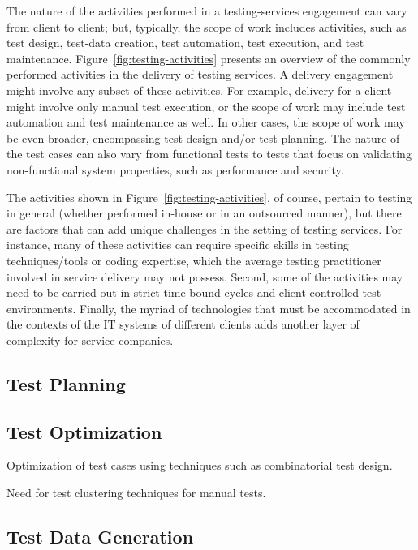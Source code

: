 The nature of the activities performed in a testing-services engagement can vary
from client to client; but, typically, the scope of work includes activities,
such as test design, test-data creation, test automation, test execution, and
test maintenance. Figure~\ref{fig:testing-activities} presents an overview of
the commonly performed activities in the delivery of testing services. A
delivery engagement might involve any subset of these activities. For example,
delivery for a client might involve only manual test execution, or the scope of
work may include test automation and test maintenance as well. In other cases,
the scope of work may be even broader, encompassing test design and/or test
planning. The nature of the test cases can also vary from functional tests to
tests that focus on validating non-functional system properties, such as
performance and security.

The activities shown in Figure~\ref{fig:testing-activities}, of course, pertain
to testing in general (whether performed in-house or in an outsourced manner),
but there are factors that can add unique challenges in the setting of testing
services. For instance, many of these activities can require specific skills in
testing techniques/tools or coding expertise, which the average testing
practitioner involved in service delivery may not possess. Second, some of the
activities may need to be carried out in strict time-bound cycles and
client-controlled test environments. Finally, the myriad of technologies that
must be accommodated in the contexts of the IT systems of different clients adds
another layer of complexity for service companies.

\subsection{Test Planning}
\label{sec:test-planning}

\subsection{Test Optimization}
\label{sec:test-design}

Optimization of test cases using techniques such as combinatorial test design.

Need for test clustering techniques for manual tests.

\subsection{Test Data Generation}
\label{sec:test-data}

